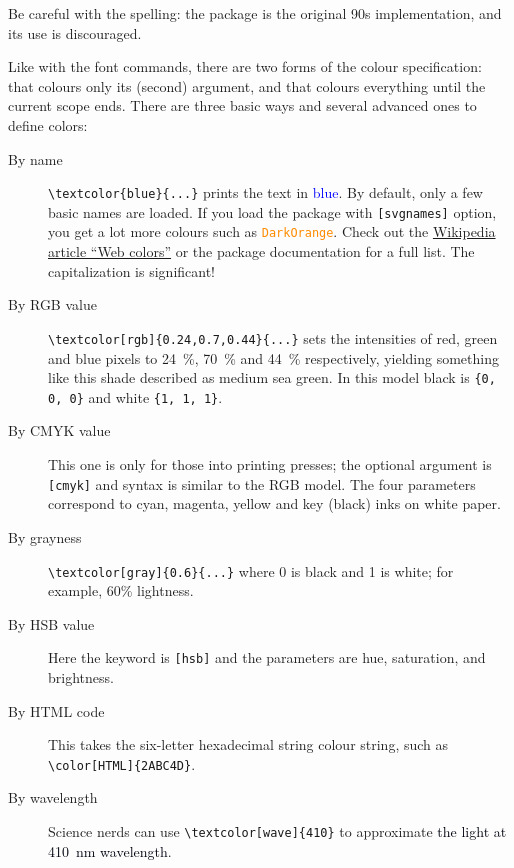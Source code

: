\begin{gotcha}
Be careful with the spelling: the  package is the original 90s implementation,
and its use is discouraged.
\end{gotcha}

Like with the font commands, there are two forms of the colour specification:
 that colours only its (second) argument,
and  that colours everything until the current scope ends.
There are three basic ways and several advanced ones to define colors:

\begin{description}
\item[By name] \verb|\textcolor{blue}{...}| prints the text in \textcolor{blue}{blue}.
    By default, only a few basic names are loaded.
    If you load the package with \verb|[svgnames]| option,
    you get a lot more colours such as \textcolor{DarkOrange}{\texttt{DarkOrange}}.
    Check out the \href{en.wikipedia.org/wiki/Web_colors}{Wikipedia article ``Web colors''}
    or the package documentation for a full list.
    The capitalization is significant!
\item[By RGB value] \verb|\textcolor[rgb]{0.24,0.7,0.44}{...}|
    sets the intensities of red, green and blue pixels to 24~\%, 70~\% and 44~\% respectively,
    yielding something like \textcolor[rgb]{0.24,0.7,0.44}{this shade described as medium sea green}.
    In this model black is \verb|{0, 0, 0}| and white \verb|{1, 1, 1}|.
\item[By CMYK value] This one is only for those into printing presses;
    the optional argument is \verb|[cmyk]| and syntax is similar to the RGB model.
    The four parameters correspond to cyan, magenta, yellow and key (black) inks on white paper.
\item[By grayness] \verb|\textcolor[gray]{0.6}{...}|
    where 0 is black and 1 is white;
    \textcolor[gray]{0.6}{for example, 60\% lightness}.
\item[By HSB value] Here the keyword is \verb|[hsb]|
    and the parameters are hue, saturation, and brightness.
\item[By HTML code] This takes the six-letter hexadecimal string colour string,
    such as {\color[HTML]{2ABC4D} \verb|\color[HTML]{2ABC4D}|}.
\item[By wavelength]
    Science nerds can use \verb|\textcolor[wave]{410}|
    to approximate \textcolor[wave]{410}{the light at 410~nm wavelength}.
\end{description}

